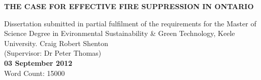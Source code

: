 \documentclass{article}
\begin{document}

\begin{titlepage}
\begin{center}
\phantom
\phantom
\phantom
\phantom
\phantom
\phantom
\phantom
\phantom
\phantom
\phantom
\phantom
\phantom
\begin{spacing}{1.5}
{ \Large \bfseries THE CASE FOR EFFECTIVE FIRE SUPPRESSION IN ONTARIO}\\
\end{spacing}
\vfill
Dissertation submitted in partial fulfilment of the requirements for the Master of Science Degree in Evironmental Sustainability \& Green Technology, Keele University. \vfill
Craig Robert Shenton\\
(Supervisor: Dr Peter Thomas)\\[.5cm]

\textbf{03 September 2012}\\[.5cm]

Word Count: 15000

\end{center}
\end{titlepage}
\end{document}
